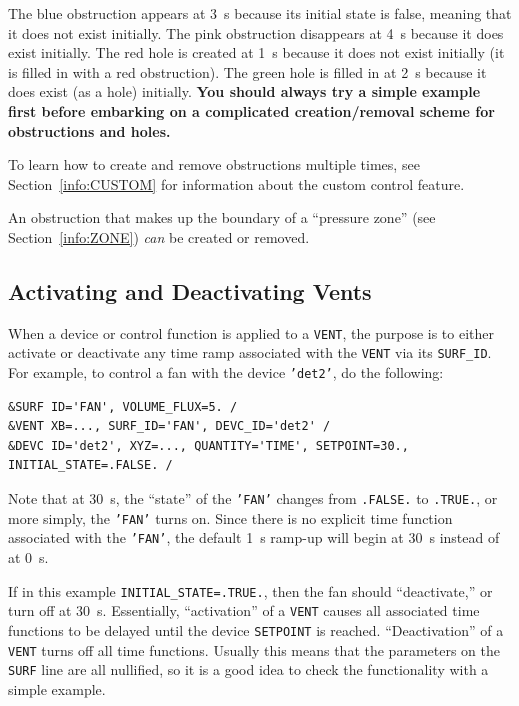 \documentclass[11pt]{book}
\newcommand{\ct}{\tt\small}
\begin{document}
\noindent
The blue obstruction appears at 3~s because its initial state is false, meaning that it does not exist initially. The pink
obstruction disappears at 4~s because it does exist initially. The red hole is created at 1~s because it does not exist initially (it is filled in with a
red obstruction). The green hole is filled in at 2~s because it does exist (as a hole) initially. {\bf You should always try a simple example first before
embarking on a complicated creation/removal scheme for obstructions and holes.}

To learn how to create and remove obstructions multiple times, see Section~\ref{info:CUSTOM} for information about the custom control feature.



\begin{warning}
An obstruction that makes up the boundary of a ``pressure zone'' (see Section~\ref{info:ZONE}) {\em can} be created or
removed.
\end{warning}


\subsection{Activating and Deactivating Vents}
\label{info:activate_deactivate}

When a device or control function is applied to a {\ct VENT}, the purpose is to either activate or deactivate any time ramp associated with
the {\ct VENT} via its {\ct SURF\_ID}. For example, to control a fan with the device {\ct 'det2'}, do the following:

\footnotesize
\begin{verbatim}
&SURF ID='FAN', VOLUME_FLUX=5. /
&VENT XB=..., SURF_ID='FAN', DEVC_ID='det2' /
&DEVC ID='det2', XYZ=..., QUANTITY='TIME', SETPOINT=30., INITIAL_STATE=.FALSE. /
\end{verbatim}
\normalsize

\noindent
Note that at 30~s, the ``state'' of the {\ct 'FAN'} changes from {\ct .FALSE.} to {\ct .TRUE.}, or more simply, the {\ct 'FAN'} turns on. Since there
is no explicit time function associated with the {\ct 'FAN'}, the default 1~s ramp-up will begin at 30~s instead of at 0~s.

If in this example {\ct INITIAL\_STATE=.TRUE.}, then the fan should ``deactivate,'' or turn off at 30~s. Essentially, ``activation'' of a {\ct VENT} causes all associated
time functions to be delayed until the device {\ct SETPOINT} is reached. ``Deactivation'' of a {\ct VENT} turns off all time functions. Usually this means
that the parameters on the {\ct SURF} line are all nullified, so it is a good idea to check the functionality with a simple example.
\end{document}

